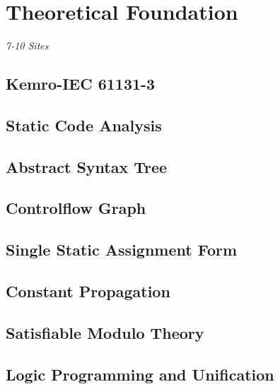 
\chapter {Theoretical Foundation}
\label {cha:theoretical foundation}
\emph{7-10 Sites}

\section{Kemro-IEC 61131-3}
\section{Static Code Analysis}
\section{Abstract Syntax Tree}
\section{Controlflow Graph}
\section{Single Static Assignment Form}
\section{Constant Propagation}
\section{Satisfiable Modulo Theory}
\section{Logic Programming and Unification}